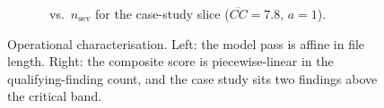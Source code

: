 \begin{figure}[!tp]
\begin{subfigure}{0.47\textwidth}
    \caption{\phindex\ vs.\ $n_{\text{sev}}$ for the case-study slice
             ($\overline{CC}=7.8$, $a=1$).}
    \label{fig:sensitivity}
  \end{subfigure}
  \caption{Operational characterisation. Left: the model pass is affine
           in file length. Right: the composite score is piecewise-linear
           in the qualifying-finding count, and the case study sits two
           findings above the critical band.}
  \label{fig:evalplots}
\end{figure}
